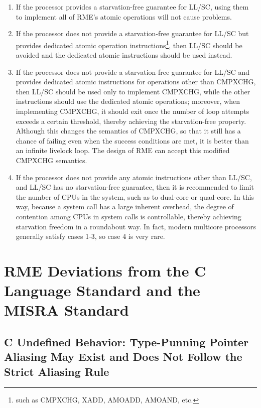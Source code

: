 \begin{enumerate}
\def\labelenumi{\arabic{enumi}.}
\item
  If the processor provides a starvation-free guarantee for LL/SC, using them to implement all of RME's atomic operations will not cause problems.
\item
  If the processor does not provide a starvation-free guarantee for LL/SC but provides dedicated atomic operation instructions\footnote{such as CMPXCHG, XADD, AMOADD, AMOAND, etc.}, then LL/SC should be avoided and the dedicated atomic instructions should be used instead.
\item
  If the processor does not provide a starvation-free guarantee for LL/SC and provides dedicated atomic instructions for operations other than CMPXCHG, then LL/SC should be used only to implement CMPXCHG, while the other instructions should use the dedicated atomic operations; moreover, when implementing CMPXCHG, it should exit once the number of loop attempts exceeds a certain threshold, thereby achieving the starvation-free property. Although this changes the semantics of CMPXCHG, so that it still has a chance of failing even when the success conditions are met, it is better than an infinite livelock loop. The design of RME can accept this modified CMPXCHG semantics.
\item
  If the processor does not provide any atomic instructions other than LL/SC, and LL/SC has no starvation-free guarantee, then it is recommended to limit the number of CPUs in the system, such as to dual-core or quad-core. In this way, because a system call has a large inherent overhead, the degree of contention among CPUs in system calls is controllable, thereby achieving starvation freedom in a roundabout way. In fact, modern multicore processors generally satisfy cases 1-3, so case 4 is very rare.
\end{enumerate}

\section{RME Deviations from the C Language Standard and the MISRA Standard}\label{sec:9-c-and-misra-deviations}

\subsection{C Undefined Behavior: Type-Punning Pointer Aliasing May Exist and Does Not Follow the Strict Aliasing Rule}\label{subsec:9-type-punning-aliasing}


